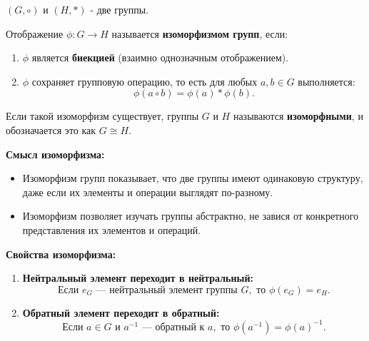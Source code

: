 \begin{shdef}
    \begin{definition}  \( (G, \circ) \) и \( (H, \ast) \) - две группы.
    \leavevmode \nl

    Отображение \( \phi: G \to H \) называется \textbf{изоморфизмом групп}, если:
    \begin{enumerate}
        \item \( \phi \) является \textbf{биекцией} (взаимно однозначным отображением).
        \item \( \phi \) сохраняет групповую операцию, то есть для любых \( a, b \in G \) выполняется:
        \[
        \phi(a \circ b) = \phi(a) \ast \phi(b).
        \]
    \end{enumerate}

    Если такой изоморфизм существует, группы \( G \) и \( H \) называются \textbf{изоморфными}, и обозначается это как \( G \cong H \).
    
    \textbf{Смысл изоморфизма:}
    \begin{itemize}
        \item Изоморфизм групп показывает, что две группы имеют одинаковую структуру, даже если их элементы и операции выглядят по-разному.
        \item Изоморфизм позволяет изучать группы абстрактно, не завися от конкретного представления их элементов и операций.
    \end{itemize}
    \end{definition}
\end{shdef}

\begin{shex}
\textbf{Свойства изоморфизма:}
\leavevmode \nl

\begin{enumerate}
    \item \textbf{Нейтральный элемент переходит в нейтральный:} 
          \[
            \text{Если } e_G \text{ — нейтральный элемент группы } G, \text{ то } \phi(e_G) = e_H.
          \]

    \item \textbf{Обратный элемент переходит в обратный:} 
          \[
          \text{Если } a \in G \text{ и } a^{-1} \text{ — обратный к } a, \text{ то } \phi(a^{-1}) = \phi(a)^{-1}.
          \]
\end{enumerate}
\end{shex}




